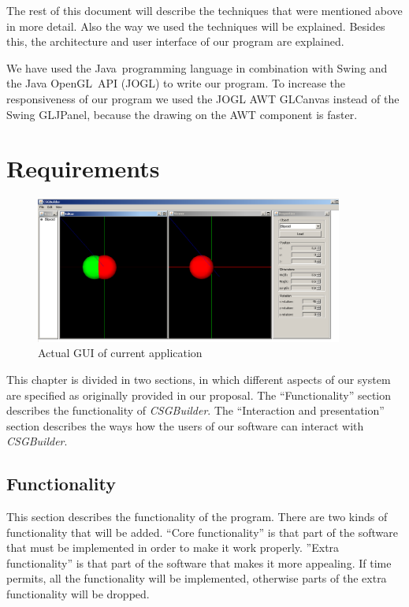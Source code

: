\documentclass[a4wide,10pt,twocolumn]{article}
\begin{document}
The rest of this document will describe the techniques that were mentioned above in more detail. Also the way we used the techniques will be explained. Besides this, the architecture and user interface of our program are explained.

We have used the Java\textcopyright\ programming language in combination with Swing and the Java OpenGL\texttrademark\ API (JOGL) to write our program. To increase the responsiveness of our program we used the JOGL AWT GLCanvas instead of the Swing GLJPanel, because the drawing on the AWT component is faster.

\section{Requirements}
\begin{figure}[t!]
\centering
\includegraphics[width = 0.9\textwidth]{images/gui}
\caption{Actual GUI of current application}
\label{figure:gui}
\end{figure}
This chapter is divided in two sections, in which different aspects of our system are specified as originally provided in our proposal. The ``Functionality'' section describes the functionality of \emph{CSGBuilder}. The ``Interaction and presentation'' section describes the ways how the users of our software can interact with \emph{CSGBuilder}.

\subsection{Functionality}
This section describes the functionality of the program. There are two kinds of functionality that will be added. ``Core functionality'' is that part of the software that must be implemented in order to make it work properly. ''Extra functionality'' is that part of the software that makes it more appealing. If time permits, all the functionality will be implemented, otherwise parts of the extra functionality will be dropped.
\end{document}
